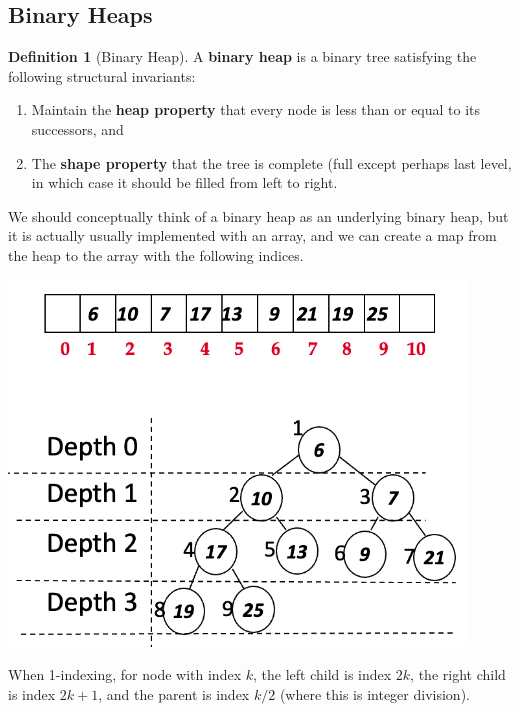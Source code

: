 \documentclass{article}
\theoremstyle{definition}
\theoremstyle{remark}
\theoremstyle{definition}
\newtheorem{definition}{Definition}[section]
\begin{document}
\subsection{Binary Heaps}

\begin{definition}[Binary Heap]
A \textbf{binary heap} is a binary tree satisfying the following structural invariants: 
\begin{enumerate}
    \item Maintain the \textbf{heap property} that every node is less than or equal to its successors, and 
    \item The \textbf{shape property} that the tree is complete (full except perhaps last level, in which case it should be filled from left to right. 
\end{enumerate}
We should conceptually think of a binary heap as an underlying binary heap, but it is actually usually implemented with an array, and we can create a map from the heap to the array with the following indices. 
\begin{center}
    \includegraphics[scale=0.5]{img/binary_heap.png}
\end{center}
When 1-indexing, for node with index $k$, the left child is index $2k$, the right child is index $2k + 1$, and the parent is index $k/2$ (where this is integer division). 
\end{definition}
\end{document}
